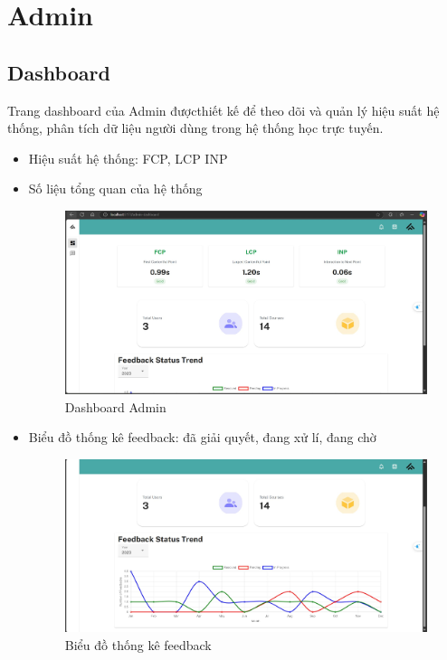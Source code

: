 \section{Admin}
\subsection{Dashboard}
Trang dashboard của Admin đượcthiết kế để theo dõi và quản lý hiệu suất hệ thống, phân tích dữ liệu người dùng trong hệ thống học trực tuyến.
\begin{itemize}
    \item Hiệu suất hệ thống: FCP, LCP INP
    \item Số liệu tổng quan của hệ thống
    \begin{figure}[H]
        \centering
        \includegraphics[width=0.8\linewidth]{images/dashboard_stat.png}
        \caption{Dashboard Admin}
        \label{fig:enter-label}
    \end{figure}
    \item Biểu đồ thống kê feedback: đã giải quyết, đang xử lí, đang chờ
    \begin{figure}[H]
        \centering
        \includegraphics[width=0.8\linewidth]{images/dashboard_feedback.png}
        \caption{Biểu đồ thống kê feedback}
        \label{fig:enter-label}
    \end{figure}
\end{itemize}
